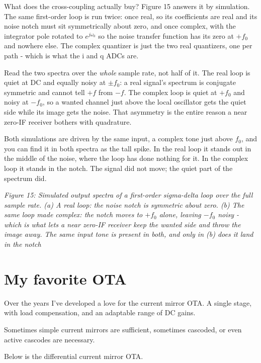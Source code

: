 What does the cross-coupling actually buy? Figure 15 answers it by
simulation. The same first-order loop is run twice: once real, so its
coefficients are real and its noise notch must sit symmetrically about
zero, and once complex, with the integrator pole rotated to
\(e^{j\omega_0}\) so the noise transfer function has its zero at
\(+f_0\) and nowhere else. The complex quantizer is just the two real
quantizers, one per path - which is what the i and q ADCs are.

Read the two spectra over the \emph{whole} sample rate, not half of it.
The real loop is quiet at DC and equally noisy at \(\pm f_0\): a real
signal's spectrum is conjugate symmetric and cannot tell \(+f\) from
\(-f\). The complex loop is quiet at \(+f_0\) and noisy at \(-f_0\), so
a wanted channel just above the local oscillator gets the quiet side
while its image gets the noise. That asymmetry is the entire reason a
near zero-IF receiver bothers with quadrature.

Both simulations are driven by the same input, a complex tone just above
\(f_0\), and you can find it in both spectra as the tall spike. In the
real loop it stands out in the middle of the noise, where the loop has
done nothing for it. In the complex loop it stands in the notch. The
signal did not move; the quiet part of the spectrum did.


{
\centering
{}
}

\emph{Figure 15: Simulated output spectra of a first-order sigma-delta
loop over the full sample rate. (a) A real loop: the noise notch is
symmetric about zero. (b) The same loop made complex: the notch moves to
\(+f_0\) alone, leaving \(-f_0\) noisy - which is what lets a near
zero-IF receiver keep the wanted side and throw the image away. The same
input tone is present in both, and only in (b) does it land in the
notch}

\section{My favorite OTA}\label{my-favorite-ota}

Over the years I've developed a love for the current mirror OTA. A
single stage, with load compensation, and an adaptable range of DC
gains.

Sometimes simple current mirrors are sufficient, sometimes cascoded, or
even active cascodes are necessary.

Below is the differential current mirror OTA.


